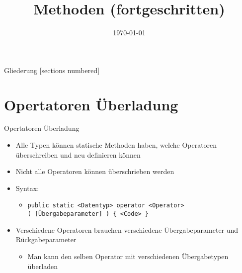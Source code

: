 



\title{Methoden (fortgeschritten)}
\date{\today}




\maketitle

\begin{frame}{Gliederung}
	[sections numbered]
	\tableofcontents
\end{frame}

\section{Opertatoren Überladung}
\begin{frame}{Opertatoren Überladung}
	\begin{itemize}
		\item Alle Typen können statische Methoden haben, welche Operatoren überschreiben und neu definieren können
		\item Nicht alle Operatoren können überschrieben werden
		\item Syntax:
		\begin{itemize}
			\item \texttt{public static \alert{<Datentyp>} operator \alert{<Operator>}\\( \alert{[Übergabeparameter]} ) \{ \alert{<Code>} \}}
		\end{itemize}
		\item Verschiedene Operatoren brauchen verschiedene Übergabeparameter und Rückgabeparameter
		\begin{itemize}
			 \item Man kann den selben Operator mit verschiedenen Übergabetypen überladen
		\end{itemize}
	\end{itemize}
\end{frame}

